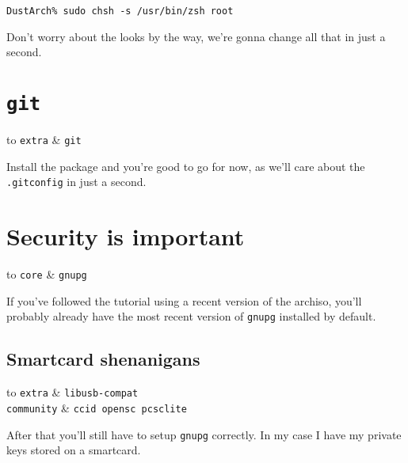 \documentclass[9pt]{report}
\newenvironment{packagetable}
{\begin{longtabu}to \textwidth [b]{X[1,r]|X[1,l]}}
{\end{longtabu}}
\begin{document}
\begin{verbatim}
DustArch% sudo chsh -s /usr/bin/zsh root
\end{verbatim}

Don’t worry about the looks by the way, we’re gonna change all that in just a second.



\newpage

\hypertarget{x-git}{\section{\texttt{git}}}
\begin{packagetable}
    \texttt{extra} & \texttt{git} \\ 
\end{packagetable}

Install the package and you’re good to go for now, as we’ll care about the \texttt{.gitconfig} in just a second.



\newpage

\hypertarget{x-security-is-important}{\section{Security is important}}
\begin{packagetable}
    \texttt{core} & \texttt{gnupg} \\ 
\end{packagetable}

If you’ve followed the tutorial using a recent version of the archiso, you’ll probably already have the most recent version of \texttt{gnupg} installed by default.



\newpage

\hypertarget{x-smartcard-shenanigans}{\subsection{Smartcard shenanigans}}
\begin{packagetable}
    \texttt{extra} & \texttt{libusb-compat} \\ 
    \texttt{community} & \texttt{ccid opensc pcsclite} \\ 
\end{packagetable}

After that you’ll still have to setup \texttt{gnupg} correctly.
In my case I have my private keys stored on a smartcard.
\end{document}
